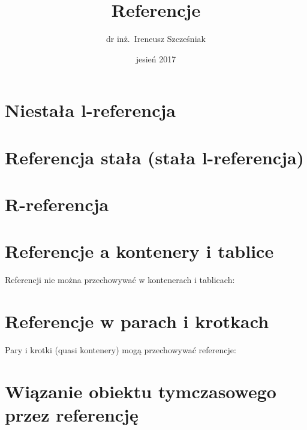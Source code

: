 \documentclass{article}
\title{Referencje}
\author{dr inż.~Ireneusz Szcześniak}
\date{jesień 2017}
\begin{document}
\maketitle

\section{Niestała l-referencja}



\section{Referencja stała (stała l-referencja)}



\section{R-referencja}



\section{Referencje a kontenery i tablice}

Referencji nie można przechowywać w kontenerach i tablicach:



\section{Referencje w parach i krotkach}

Pary i krotki (quasi kontenery) mogą przechowywać referencje:



\section{Wiązanie obiektu tymczasowego przez referencję}


\end{document}
